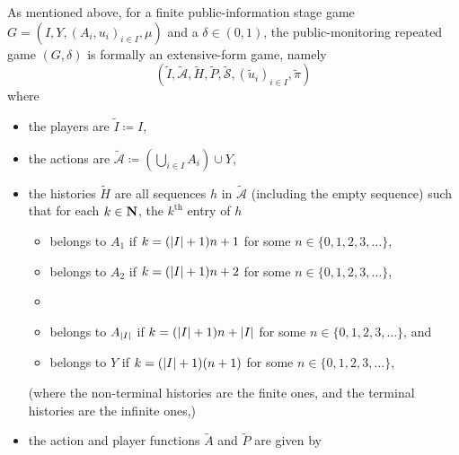\begin{remark}
	\label{remark:rep_game_formal}
	As mentioned above, for a finite public-information stage game $G = \left( I, Y, (A_i, u_i)_{i \in I}, \mu \right)$ and a $\delta \in (0,1)$, the public-monitoring repeated game $(G,\delta)$ is formally an extensive-form game, namely
	\begin{equation*}
		\left(\widetilde{I},\widetilde{\mathcal{A}},\widetilde{H},\widetilde{P},\widetilde{\mathcal{S}},\left(\widetilde{u}_i\right)_{i \in I},\widetilde{\pi}\right)
	\end{equation*}
	where
	\begin{itemize}
	
		\item the players are $\widetilde{I} \coloneqq I$,
		
		\item the actions are $\widetilde{\mathcal{A}} \coloneqq \left( \bigcup_{i \in I} A_i \right) \cup Y$,

		\item the histories $\widetilde{H}$ are all sequences $h$ in $\widetilde{\mathcal{A}}$ (including the empty sequence) such that for each $k \in \mathbf{N}$, the $k^\text{th}$ entry of $h$

		\begin{itemize}
		
			\item belongs to $A_1$ if $k = (\abs*{I}+1) n + 1$ for some $n \in \{0,1,2,3,\dots\}$,

			\item belongs to $A_2$ if $k = (\abs*{I}+1) n + 2$ for some $n \in \{0,1,2,3,\dots\}$,

			\item[\vdots]

			\item belongs to $A_{\abs*{I}}$ if $k = (\abs*{I}+1) n + \abs*{I}$ for some $n \in \{0,1,2,3,\dots\}$, and

			\item belongs to $Y$ if $k = (\abs*{I}+1) (n+1)$ for some $n \in \{0,1,2,3,\dots\}$,
		
		\end{itemize}
		(where the non-terminal histories are the finite ones, and the terminal histories are the infinite ones,)

		\item the action and player functions $\widetilde{A}$ and $\widetilde{P}$ are given by

		\begin{itemize}
		

\end{itemize}
\end{itemize}
\end{remark}
